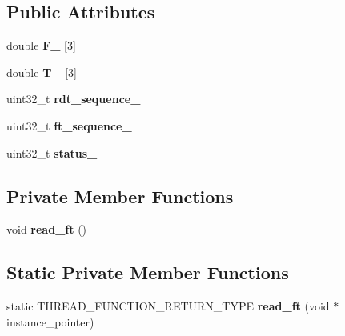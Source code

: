 \subsection*{Public Attributes}
\begin{DoxyCompactItemize}
\item 
\mbox{\label{classati__ft__sensor_1_1AtiFTSensor_a0ecc044012d8459b62512a9affb46067}} 
double {\bfseries F\+\_\+} \mbox{[}3\mbox{]}
\item 
\mbox{\label{classati__ft__sensor_1_1AtiFTSensor_a167f338cd1552c8be72e2ab142826a88}} 
double {\bfseries T\+\_\+} \mbox{[}3\mbox{]}
\item 
\mbox{\label{classati__ft__sensor_1_1AtiFTSensor_a7ca149744596b46315fa2ef591a08e7c}} 
uint32\+\_\+t {\bfseries rdt\+\_\+sequence\+\_\+}
\item 
\mbox{\label{classati__ft__sensor_1_1AtiFTSensor_a45931532f785eb26b5a8e85c5f7ab2d5}} 
uint32\+\_\+t {\bfseries ft\+\_\+sequence\+\_\+}
\item 
\mbox{\label{classati__ft__sensor_1_1AtiFTSensor_a75557dcf54e92df5e6b491cca26c57ee}} 
uint32\+\_\+t {\bfseries status\+\_\+}
\end{DoxyCompactItemize}
\subsection*{Private Member Functions}
\begin{DoxyCompactItemize}
\item 
\mbox{\label{classati__ft__sensor_1_1AtiFTSensor_ae52996f61d96739b05c01815c386c3cc}} 
void {\bfseries read\+\_\+ft} ()
\end{DoxyCompactItemize}
\subsection*{Static Private Member Functions}
\begin{DoxyCompactItemize}
\item 
\mbox{\label{classati__ft__sensor_1_1AtiFTSensor_a96564d744e3a5daeb8f56395ba7e832f}} 
static T\+H\+R\+E\+A\+D\+\_\+\+F\+U\+N\+C\+T\+I\+O\+N\+\_\+\+R\+E\+T\+U\+R\+N\+\_\+\+T\+Y\+PE {\bfseries read\+\_\+ft} (void $\ast$instance\+\_\+pointer)
\end{DoxyCompactItemize}
